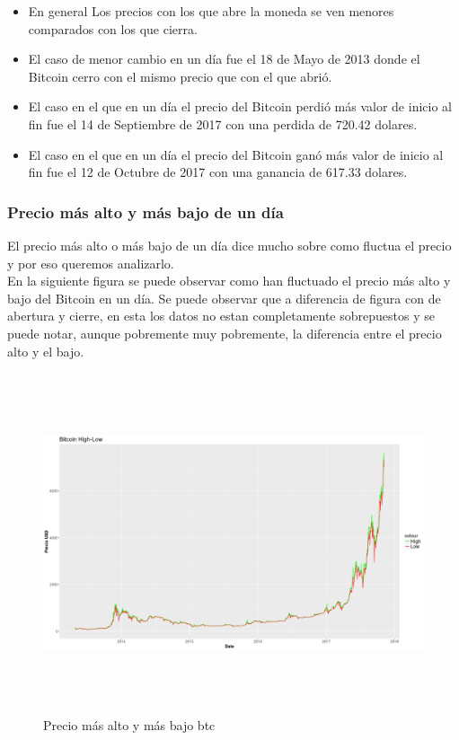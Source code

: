 \documentclass[12pt,letterpaper]{article}
\begin{document}
    \begin{itemize}

        \item En general Los precios con los que abre la moneda se ven menores comparados con los que cierra.

        \item El caso de menor cambio en un d\'ia fue el 18 de Mayo de 2013 donde el Bitcoin cerro con el mismo precio que con el que abri\'o.

        \item El caso en el que en un d\'ia el precio del Bitcoin perdi\'o m\'as valor de inicio al fin fue el 14 de Septiembre de 2017 con una perdida de 720.42 dolares.

        \item El caso en el que en un d\'ia el precio del Bitcoin gan\'o m\'as valor de inicio al fin fue el 12 de Octubre de 2017 con una ganancia de 617.33 dolares.

    \end{itemize}


    \subsubsection*{Precio más alto y más bajo de un día}

    El precio m\'as alto o m\'as bajo de un d\'ia dice mucho sobre como fluctua el precio y por eso queremos analizarlo.
    \\

    En la siguiente figura se puede observar como han fluctuado el precio m\'as alto y bajo del Bitcoin en un d\'ia. Se puede observar que a diferencia de figura con de abertura y cierre, en esta los datos no estan completamente sobrepuestos y se puede notar, aunque pobremente muy pobremente, la diferencia entre el precio alto y el bajo.
    \\

    \begin{figure}
        \centering

        \includegraphics[width = 18cm, height = 10cm]{btc/date_vs_high-low}

        \caption{Precio m\'as alto y m\'as bajo btc}
    \end{figure}
\end{document}
